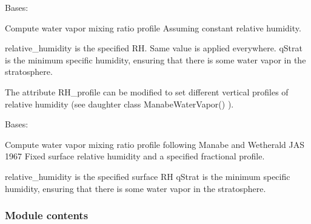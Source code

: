 \documentclass[letterpaper,10pt,english]{sphinxmanual}
\begin{document}
\begin{fulllineitems}
\label{api/climlab.radiation:climlab.radiation.water_vapor.FixedRelativeHumidity}
Bases: {\hyperref[api/climlab.process:climlab.process.diagnostic.DiagnosticProcess]{\emph{}}}

Compute water vapor mixing ratio profile
Assuming constant relative humidity.

relative\_humidity is the specified RH.
Same value is applied everywhere.
qStrat is the minimum specific humidity, ensuring that there is
some water vapor in the stratosphere.

The attribute RH\_profile can be modified to set different
vertical profiles of relative humidity
(see daughter class ManabeWaterVapor() ).

\end{fulllineitems}


\begin{fulllineitems}
\label{api/climlab.radiation:climlab.radiation.water_vapor.ManabeWaterVapor}
Bases: {\hyperref[api/climlab.radiation:climlab.radiation.water_vapor.FixedRelativeHumidity]{\emph{}}}

Compute water vapor mixing ratio profile following
Manabe and Wetherald JAS 1967
Fixed surface relative humidity and a specified fractional profile.

relative\_humidity is the specified surface RH
qStrat is the minimum specific humidity, ensuring that there is
some water vapor in the stratosphere.

\end{fulllineitems}



\subsubsection{Module contents}
\label{api/climlab.radiation:module-climlab.radiation}\label{api/climlab.radiation:module-contents}
\end{document}

